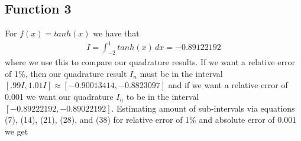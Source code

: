 \documentclass[12pt]{article}
\theoremstyle{remark}
\begin{document}
\newpage

\subsection{Function 3}

For $f(x) = tanh(x)$ we have that
\begin{align} 
I = \int_{-2}^1 tanh(x) \, dx = -0.89122192
\end{align}
where we use this to compare our quadrature results. If we want a relative error of 1\%, then our quadrature result $I_n$ must be in the interval $[.99I, 1.01I] \approx [-0.90013414, -0.8823097]$ and if we want a relative error of 0.001 we want our quadrature $I_n$ to be in the interval $[-0.89222192,-0.89022192]$. Estimating amount of sub-intervals via equations (7), (14), (21), (28), and (38) for relative error of 1\% and absolute error of 0.001 we get
\end{document}
